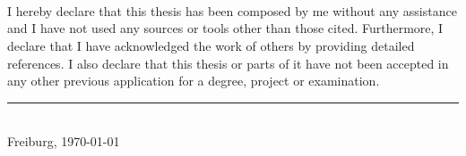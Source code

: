 \\\\\\
I hereby declare that this thesis has been composed by me without any assistance and I have not used any sources or tools other than those cited. 
Furthermore, I declare that I have acknowledged the work of others by providing detailed references.
I also declare that this thesis or parts of it have not been accepted in any other previous application for a degree, project or examination.

\vfill
\rule{5cm}{.5pt}\\
\phantom{ab}Freiburg, \today